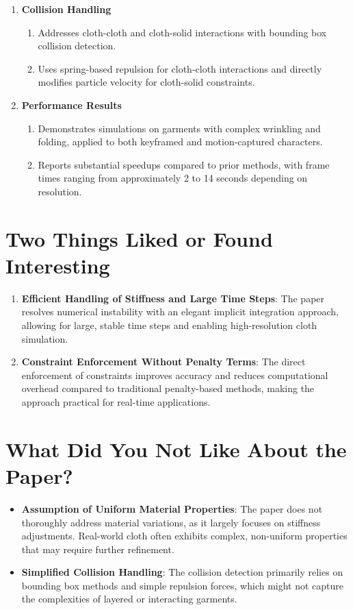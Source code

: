 \documentclass[12pt]{article}
\begin{document}
\begin{enumerate}[noitemsep]
\begin{enumerate}[noitemsep]
    \end{enumerate}
    \item \textbf{Collision Handling}
    \begin{enumerate}[noitemsep]
         \item Addresses cloth-cloth and cloth-solid interactions with bounding box collision detection.
         \item Uses spring-based repulsion for cloth-cloth interactions and directly modifies particle velocity for cloth-solid constraints.
    \end{enumerate}
    \item \textbf{Performance Results}
    \begin{enumerate}[noitemsep]
         \item Demonstrates simulations on garments with complex wrinkling and folding, applied to both keyframed and motion-captured characters.
         \item Reports substantial speedups compared to prior methods, with frame times ranging from approximately 2 to 14 seconds depending on resolution.
    \end{enumerate}
\end{enumerate}

\section{Two Things Liked or Found Interesting}
\begin{enumerate}[noitemsep]
    \item \textbf{Efficient Handling of Stiffness and Large Time Steps}: The paper resolves numerical instability with an elegant implicit integration approach, allowing for large, stable time steps and enabling high-resolution cloth simulation.
    \item \textbf{Constraint Enforcement Without Penalty Terms}: The direct enforcement of constraints improves accuracy and reduces computational overhead compared to traditional penalty-based methods, making the approach practical for real-time applications.
\end{enumerate}

\section{What Did You Not Like About the Paper?}
\begin{itemize}[noitemsep]
    \item \textbf{Assumption of Uniform Material Properties}: The paper does not thoroughly address material variations, as it largely focuses on stiffness adjustments. Real-world cloth often exhibits complex, non-uniform properties that may require further refinement.
    \item \textbf{Simplified Collision Handling}: The collision detection primarily relies on bounding box methods and simple repulsion forces, which might not capture the complexities of layered or interacting garments.
\end{itemize}
\end{document}
